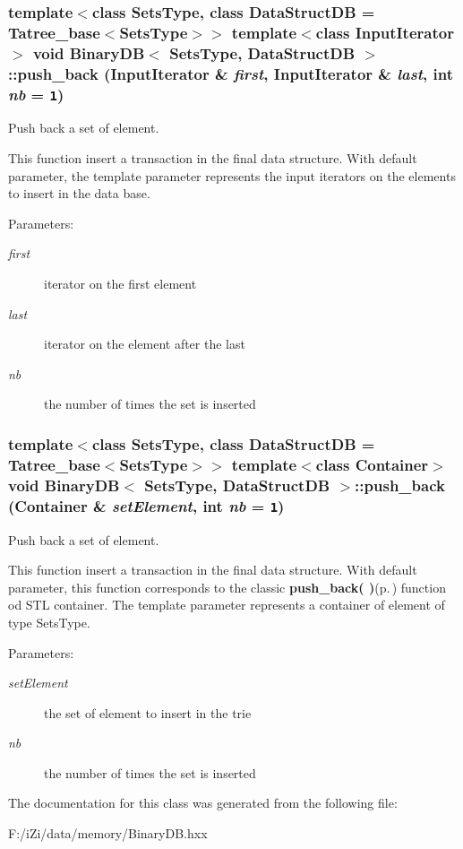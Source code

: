 \subsubsection{\setlength{\rightskip}{0pt plus 5cm}template$<$class Sets\-Type, class Data\-Struct\-DB = Tatree\_\-base$<$Sets\-Type$>$$>$ template$<$class Input\-Iterator$>$ void {\bf Binary\-DB}$<$ Sets\-Type, Data\-Struct\-DB $>$::push\_\-back (Input\-Iterator \& {\em first}, Input\-Iterator \& {\em last}, int {\em nb} = {\tt 1})\hspace{0.3cm}{\tt  [inline]}}\label{class_binary_d_b_d91fcffa6875b442c3994a2ea51d471a}


Push back a set of element. 

This function insert a transaction in the final data structure. With default parameter, the template parameter represents the input iterators on the elements to insert in the data base. \begin{Desc}
\item[Parameters:]
\begin{description}
\item[{\em first}]iterator on the first element \item[{\em last}]iterator on the element after the last \item[{\em nb}]the number of times the set is inserted \end{description}
\end{Desc}
\subsubsection{\setlength{\rightskip}{0pt plus 5cm}template$<$class Sets\-Type, class Data\-Struct\-DB = Tatree\_\-base$<$Sets\-Type$>$$>$ template$<$class Container$>$ void {\bf Binary\-DB}$<$ Sets\-Type, Data\-Struct\-DB $>$::push\_\-back (Container \& {\em set\-Element}, int {\em nb} = {\tt 1})\hspace{0.3cm}{\tt  [inline]}}\label{class_binary_d_b_14ff7dc20fded0c3fddc065318fc2b58}


Push back a set of element. 

This function insert a transaction in the final data structure. With default parameter, this function corresponds to the classic {\bf push\_\-back( )}{\rm (p.\,\pageref{class_binary_d_b_14ff7dc20fded0c3fddc065318fc2b58})} function od STL container. The template parameter represents a container of element of type Sets\-Type. \begin{Desc}
\item[Parameters:]
\begin{description}
\item[{\em set\-Element}]the set of element to insert in the trie \item[{\em nb}]the number of times the set is inserted \end{description}
\end{Desc}


The documentation for this class was generated from the following file:\begin{CompactItemize}
\item 
F:/i\-Zi/data/memory/Binary\-DB.hxx\end{CompactItemize}
